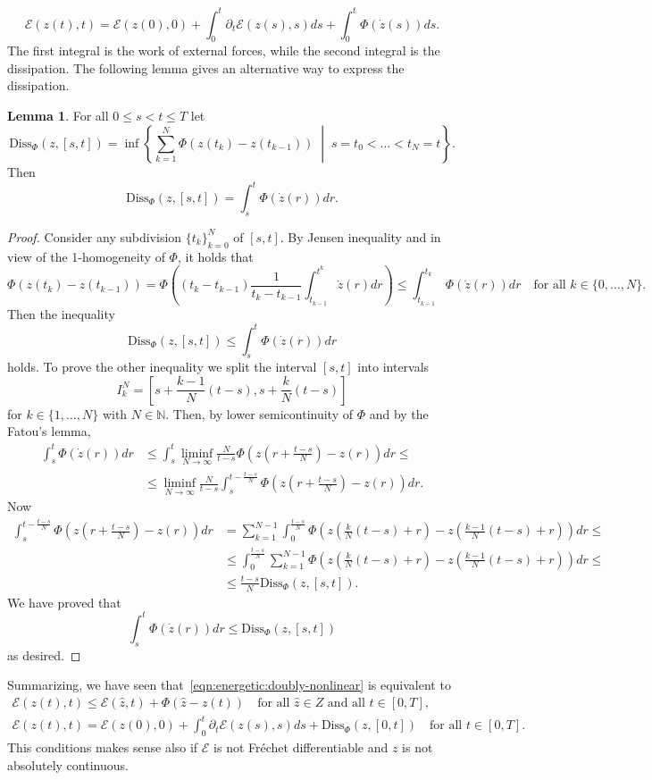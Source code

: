 \documentclass[a4paper,10pt,twoside]{amsbook}
\numberwithin{section}{chapter}
\numberwithin{equation}{chapter}
\theoremstyle{definition}
\newtheorem{lemma}[prop]{Lemma}
\begin{document}
\[
\mathcal{E}(z(t),t)=\mathcal{E}(z(0),0)+\int_0^t\partial_t\mathcal{E}(z(s),s)ds+\int_0^t\Phi(\dot z(s))ds.
\]
The first integral is the work of external forces, while the second integral is the dissipation. The following lemma gives an alternative way to express the dissipation.
\begin{lemma}
For all $0\le s<t\le T$ let
\[
\text{Diss}_\Phi(z,[s,t])=\inf\left\{\sum_{k=1}^N\Phi(z(t_k)-z(t_{k-1}))\;\middle|\;s=t_0<\dots<t_N=t\right\}.
\]
Then
\[
\text{Diss}_\Phi(z,[s,t])=\int_s^t\Phi(\dot z(r))dr.
\]
\end{lemma}
\begin{proof}
Consider any subdivision $\{t_k\}_{k=0}^N$ of $[s,t]$. By Jensen inequality and in view of the 1-homogeneity of $\Phi$, it holds that
\[
\Phi(z(t_k)-z(t_{k-1}))=\Phi\left((t_k-t_{k-1})\frac{1}{t_k-t_{k-1}}\int_{t_{k-1}}^{t^k}\dot z(r)dr\right)\le\int_{t_{k-1}}^{t_k}\Phi(\dot z(r))dr\quad\text{for all $k\in\{0,\dots,N\}$}.
\]
Then the inequality
\[
\text{Diss}_\Phi(z,[s,t])\le\int_s^t\Phi(\dot z(r))dr
\]
holds. To prove the other inequality we split the interval $[s,t]$ into intervals
\[
I_k^N=\left[s+\frac{k-1}{N}(t-s),s+\frac{k}{N}(t-s)\right]
\]
for $k\in\{1,\dots,N\}$ with $N\in\mathbb{N}$. Then, by lower semicontinuity of $\Phi$ and by the Fatou's lemma,
\[
\begin{split}
\int_s^{t}\Phi(\dot z(r))dr&\le\int_s^t\liminf_{N\to\infty}\frac{N}{t-s}\Phi\left(z\left(r+\frac{t-s}{N}\right)-z(r)\right)dr\le\\
&\le\liminf_{N\to\infty}\frac{N}{t-s}\int_s^{t-\frac{t-s}{N}}\Phi\left(z\left(r+\frac{t-s}{N}\right)-z(r)\right)dr.
\end{split}
\]
Now
\[
\begin{split}
\int_s^{t-\frac{t-s}{N}}\Phi\left(z\left(r+\frac{t-s}{N}\right)-z(r)\right)dr&=\sum_{k=1}^{N-1}\int_0^{\frac{t-s}{N}}\Phi\left(z\left(\frac{k}{N}(t-s)+r\right)-z\left(\frac{k-1}{N}(t-s)+r\right)\right)dr\le\\
&\le\int_0^{\frac{t-s}{N}}\sum_{k=1}^{N-1}\Phi\left(z\left(\frac{k}{N}(t-s)+r\right)-z\left(\frac{k-1}{N}(t-s)+r\right)\right)dr\le\\
&\le\frac{t-s}{N}\text{Diss}_\Phi(z,[s,t]).
\end{split}
\]
We have proved that
\[
\int_s^{t}\Phi(\dot z(r))dr\le\text{Diss}_\Phi(z,[s,t])
\]
as desired.
\end{proof}
Summarizing, we have seen that~\eqref{eqn:energetic:doubly-nonlinear} is equivalent to
\begin{subequations}
\label{eqn:energetic:motivation-definition}
\begin{gather}
\mathcal{E}(z(t),t)\le\mathcal{E}(\hat{z},t)+\Phi(\hat{z}-z(t))\quad\text{for all $\hat{z}\in Z$ and all $t\in[0,T]$},\\
\mathcal{E}(z(t),t)=\mathcal{E}(z(0),0)+\int_0^t\partial_t\mathcal{E}(z(s),s)ds+\text{Diss}_\Phi(z,[0,t])\quad\text{for all $t\in[0,T]$}.
\end{gather}
\end{subequations}
This conditions makes sense also if $\mathcal{E}$ is not Fréchet differentiable and $z$ is not absolutely continuous.
\end{document}
